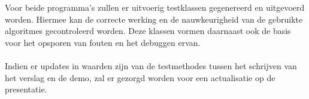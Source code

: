 
\\
\\
Voor beide programma's zullen er uitvoerig testklassen gegenereerd en uitgevoerd worden. Hiermee kan de correcte werking en de nauwkeurigheid van de gebruikte algoritmes gecontroleerd worden. Deze klassen vormen daarnaast ook de basis voor het opsporen van fouten en het debuggen ervan.
\\
\\
Indien er updates in waarden zijn van de testmethodes tussen het schrijven van het verslag en de demo, zal er gezorgd worden voor een actualisatie op de presentatie.